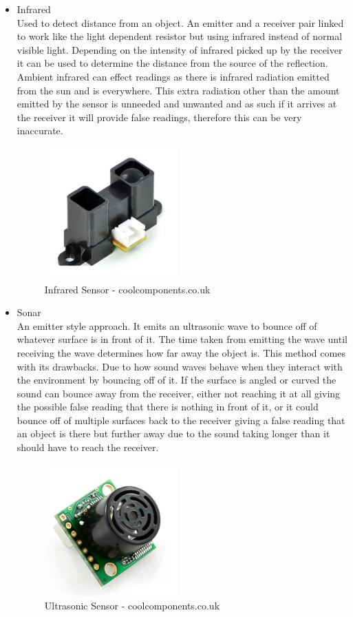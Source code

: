 \begin{itemize}
\item Infrared
\\Used to detect distance from an object.  An emitter and a receiver pair linked to work like the light dependent resistor but using infrared instead of normal visible light.  Depending on the intensity of infrared picked up by the receiver it can be used to determine the distance from the source of the reflection.  Ambient infrared can effect readings as there is infrared radiation emitted from the sun and is everywhere.  This extra radiation other than the amount emitted by the sensor is unneeded and unwanted and as such if it arrives at the receiver it will provide false readings, therefore this can be very inaccurate.
\begin{figure}[h]
\centering
        \includegraphics[width=2.0in] {Images/ir.jpg}
        \caption{Infrared Sensor - coolcomponents.co.uk}
        \label{Infrared Sensor}
\end{figure}

\item Sonar
\\An emitter style approach.  It emits an ultrasonic wave to bounce off of whatever surface is in front of it.  The time taken from emitting the wave until receiving the wave determines how far away the object is.  This method comes with its drawbacks.  Due to how sound waves behave when they interact with the environment by bouncing off of it.  If the surface is angled or curved the sound can bounce away from the receiver, either not reaching it at all giving the possible false reading that there is nothing in front of it, or it could bounce off of multiple surfaces back to the receiver giving a false reading that an object is there but further away due to the sound taking longer than it should have to reach the receiver.
\begin{figure}[h]
\centering
        \includegraphics[width=2.0in] {Images/sonar.jpg}
        \caption{Ultrasonic Sensor - coolcomponents.co.uk}
        \label{Ultrasonic Sensor}
\end{figure}

\end{itemize}
